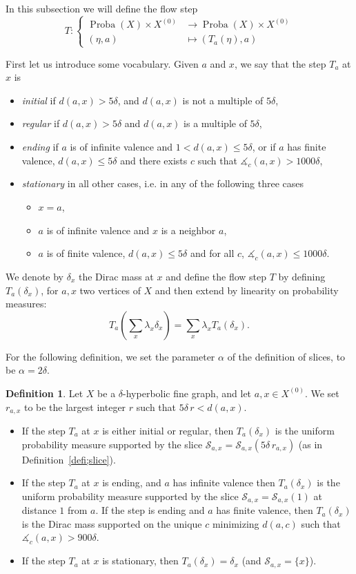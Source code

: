 \documentclass[11pt]{article}
\theoremstyle{definition}
\newtheorem{defi}[theo]{Definition}
\numberwithin{equation}{section}
\DeclareMathOperator{\Proba}{Proba}
\newcommand{\A}{\measuredangle}
\begin{document}
In this subsection we will define the flow step
\[
T: \left\{
\begin{aligned} \Proba(X) \times X^{(0)} & \to \Proba(X) \times X^{(0)} \\
(\eta, a) & \mapsto (T_a(\eta), a)
\end{aligned} \right.
\]

First let us introduce some vocabulary. Given $a$ and $x$, we say that the step $T_a$ at $x$ is
\begin{itemize}
\item \emph{initial} if $d(a,x)>5\delta$, and $d(a,x)$ is not a multiple of $5\delta$,
\item \emph{regular} if $d(a,x)>5\delta$ and $d(a,x)$ is a multiple of $5\delta$,
\item \emph{ending} if $a$ is of infinite valence and $1<d(a,x)\leq 5\delta$, or if $a$ has finite valence, $d(a,x) \leq 5\delta$ and there exists $c$ such that $\A_c(a,x) > 1000\delta$,
\item \emph{stationary} in all other cases, i.e. in any of the following three cases
\begin{itemize}
\item[$\bullet$] $x=a$,
\item[$\bullet$] $a$ is of infinite valence and $x$ is a neighbor $a$,
\item[$\bullet$] $a$ is of finite valence, $d(a,x) \leq 5\delta$ and for all $c$, $\A_c(a,x) \leq1000\delta$.
\end{itemize}
\end{itemize}
We denote by
$\delta_x $ the Dirac mass at $x$ and define the flow step $T$ by defining $T_a(\delta_x)$, for $a, x$ two vertices of $X$ and then extend by linearity on probability measures:
\[
T_a\left(\sum_x \lambda_x \delta_x\right) = \sum_x \lambda_x T_a(\delta_x).
\]

For the following definition, we set the parameter $\alpha$ of the definition of slices, to be $\alpha = 2\delta$.

\begin{defi}\label{defi:flowstep}
Let $X$ be a $\delta$-hyperbolic fine graph, and let $a,x\in X^{(0)}$. We set $r_{a,x}$ to be the largest integer $r$
such that $5\delta\,r < d(a,x)$.
\begin{itemize}
\item If the step $T_a$ at $x$ is either initial or regular, then $T_a(\delta_x)$ is the uniform probability measure supported by the slice $\mathcal{S}_{a,x}=\mathcal{S}_{a,x}(5\delta\,r_{a,x})$ (as in Definition~\ref{defi;slice}).
\item If the step $T_a$ at $x$ is ending, and $a$ has infinite valence then $T_a(\delta_x)$ is the uniform probability measure supported by the slice $\mathcal{S}_{a,x} = \mathcal{S}_{a,x}(1)$ at distance $1$ from $a$. If the step is ending and $a$ has finite valence, then $T_a(\delta_x)$ is the Dirac mass supported on the unique $c$ minimizing $d(a,c)$ such that $\A_c(a,x) > 900\delta$.
\item If the step $T_a$ at $x$ is stationary, then $T_a(\delta_x) =
\delta_x$ (and $\mathcal{S}_{a,x} = \{x\}$).
\end{itemize}
\end{defi}
\end{document}
